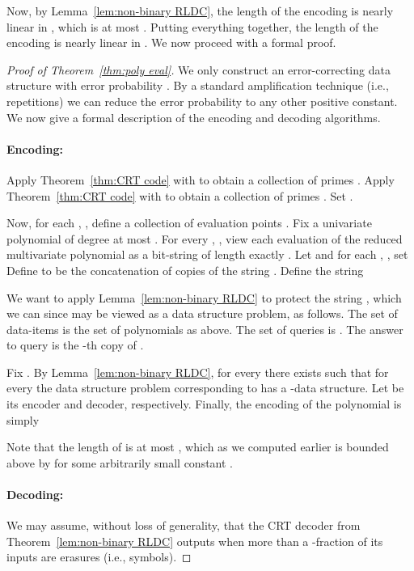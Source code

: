\documentclass[11pt,english]{article}
\theoremstyle{definition}
\theoremstyle{remark}
\begin{document}
Now, by Lemma~\ref{lem:non-binary RLDC}, the length of the encoding
is nearly linear in ,
which is at most .
Putting everything together, the length of the encoding is nearly
linear in . We now proceed with a formal proof.

\begin{proof}[Proof of Theorem~\ref{thm:poly eval}]We only construct
an error-correcting data structure with error probability .
By a standard amplification technique (i.e.,  repetitions)
we can reduce the error probability to any other positive constant.
We now give a formal description of the encoding and decoding algorithms.

\paragraph{\textbf{Encoding:}}
Apply Theorem~\ref{thm:CRT code} with  to obtain a collection of primes .
Apply Theorem~\ref{thm:CRT code} with  to obtain a collection of primes . 
Set . 

Now, for each , , define a collection of evaluation points . 
Fix a univariate polynomial  of degree at most . 
For every , ,
view each evaluation of the reduced multivariate polynomial 
as a bit-string of length exactly .
Let  and for each , , set 
Define  to be the concatenation of  copies of 
the string .
Define the string  

We want to apply Lemma~\ref{lem:non-binary RLDC} to protect the
string , which we can since  may be viewed as a data structure
problem, as follows. 
The set of data-items is the set of polynomials  as above.
The set of queries  is .
The answer to query 
is the -th copy of .

Fix . By Lemma~\ref{lem:non-binary RLDC},
for every  there exists  such that for every 
the data structure problem corresponding to  has a -data
structure. Let  be its encoder and decoder, respectively. 
Finally, the encoding of the polynomial  is simply 

Note that the length of  is at most ,
which as we computed earlier is bounded above by  for some arbitrarily small constant .

\paragraph{\textbf{Decoding:}}
We may assume, without loss of generality, that the CRT decoder 
from Theorem~\ref{lem:non-binary RLDC} outputs  when more
than a -fraction of its inputs are erasures (i.e.,  symbols).


\end{proof}
\end{document}

